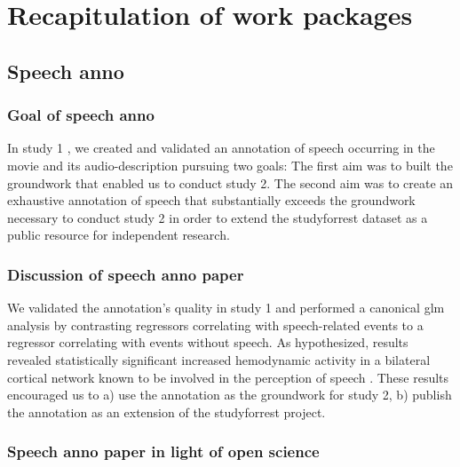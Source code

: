 \section{Recapitulation of work packages}



\subsection{Speech anno}


\subsubsection{Goal of speech anno}

In study 1 \citep{haeusler2021speechanno}, we created and validated an
annotation of speech occurring in the movie and its audio-description pursuing
two goals:
The first aim was to built the groundwork that enabled us to conduct study 2.
The second aim was to create an exhaustive annotation of speech that
substantially exceeds the groundwork necessary to conduct study 2 in order to
extend the studyforrest dataset as a public resource for independent research.


\subsubsection{Discussion of speech anno paper}

We validated the annotation's quality in study 1 and performed a canonical
\ac{glm} analysis by contrasting regressors correlating with speech-related
events to a regressor correlating with events without speech.
As hypothesized, results revealed statistically significant increased
hemodynamic activity in a bilateral cortical network known to be involved in the
perception of speech \citep[e.g.,][]{friederici2011brain, wilson2008beyond}.
These results encouraged us to a) use the annotation as the groundwork for study
2, b) publish the annotation as an extension of the studyforrest project.


\subsubsection{Speech anno paper in light of open science}


